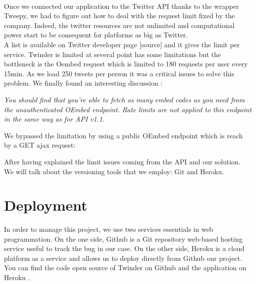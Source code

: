  \paragraph{}
Once we connected our application to the Twitter API thanks to the wrapper Tweepy, we had to figure out how to deal with the request limit fixed by the company. Indeed, the twitter resources are not unlimited and computational power start to be consequent for platforms as big as Twitter. \\
A list is available on Twitter developer page [source] and it gives the limit per service. Twinder is limited at several point has some limitations but the bottleneck is the Oembed request which is limited to 180 requests per user every 15min. As we load 250 tweets per person it was a critical issues to solve this problem. We finally found an interesting discussion \cite{t_oembed2}:

\textit{You should find that you're able to fetch as many embed codes as you need from the unauthenticated OEmbed endpoint. Rate limits are not applied to this endpoint in the same way as for API v1.1.}

We bypassed the limitation by using a public OEmbed endpoint which is reach by a GET ajax request:

 


After having explained the limit issues coming from the API and our solution. We will talk about the versioning tools that we employ: Git and Heroku.

 \section{Deployment}
 
  \paragraph{}
 In order to manage this project, we use two services essentials in web programmation. On the one side, Github is a Git repository web-based hosting service useful to track the bug in our case. On the other side, Heroku is a cloud platform as a service and allows us to deploy directly from Github our project.
You can find the code open source of Twinder on Github \cite{tw_github} and the application on Heroku \cite{tw_heroku}.





